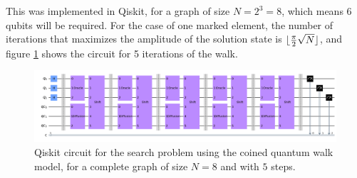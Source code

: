 \documentclass[../../dissertation.tex]{subfiles}
\begin{document}
This was implemented in Qiskit, for a graph of size $N=2^3=8$, which means $6$
qubits will be required. For the case of one marked element, the number of
iterations that maximizes the amplitude of the solution state is
$\lfloor\frac{\pi}{2} \sqrt{N}\rfloor$, and figure
\ref{fig:coinedQWSearchCircuitQistkit} shows the circuit for 5 iterations of
the walk.
\begin{figure}[!h]
	\centering
	\includegraphics[scale=0.21]{img/Qiskit/CoinedQuantumWalk/Search/Circuits/CoinedSearchQiskitCirc_N3_M0_S5.png}
	\caption{Qiskit circuit for the search problem using the coined quantum walk model, for a complete graph of size $N=8$ and with $5$ steps.} 
	\label{fig:coinedQWSearchCircuitQistkit}
\end{figure}\par
\end{document}
